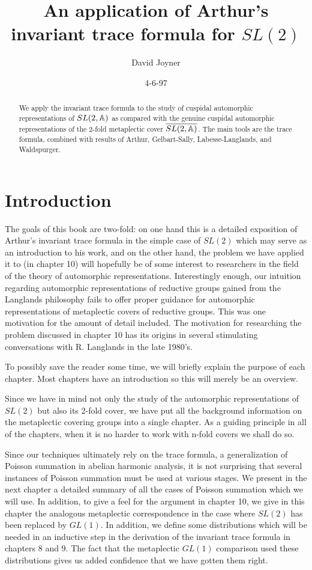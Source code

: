 \documentclass[12pt,thmsa]{book}
\begin{document}
\author{David Joyner}
\title{An application of Arthur's invariant trace formula for $SL(2)$}
\date{4-6-97}
\maketitle

\begin{abstract}
We apply the invariant trace formula to the study of cuspidal automorphic
representations of $SL(2,\Bbb{A})$ as compared with the genuine cuspidal
automorphic representations of the 2-fold metaplectic cover $\overline{SL(2,%
\Bbb{A})}$. The main tools are the trace formula, combined with results of
Arthur, Gelbart-Sally, Labesse-Langlands, and Waldspurger.
\end{abstract}

\tableofcontents

\chapter{Introduction}

The goals of this book are two-fold: on one hand this is a detailed
exposition of Arthur's invariant trace formula in the simple case of $SL(2)$
which may serve as an introduction to his work, and on the other hand, the
problem we have applied it to (in chapter 10) will hopefully be of some
interest to researchers in the field of the theory of automorphic
representations. Interestingly enough, our intuition regarding automorphic
representations of reductive groups gained from the Langlands philosophy
fails to offer proper guidance for automorphic representations of
metaplectic covers of reductive groups. This was one motivation for the
amount of detail included. The motivation for researching the problem
discussed in chapter 10 has its origins in several stimulating conversations
with R. Langlands in the late 1980's.

To possibly save the reader some time, we will briefly explain the purpose
of each chapter. Most chapters have an introduction so this will merely be
an overview.

Since we have in mind not only the study of the automorphic representations
of $SL(2)$ but also its 2-fold cover, we have put all the background
information on the metaplectic covering groups into a single chapter. As a
guiding principle in all of the chapters, when it is no harder to work with
n-fold covers we shall do so.

Since our techniques ultimately rely on the trace formula, a generalization
of Poisson summation in abelian harmonic analysis, it is not surprising that
several instances of Poisson summation must be used at various stages. We
present in the next chapter a detailed summary of all the cases of Poisson
summation which we will use. In addition, to give a feel for the argument in
chapter 10, we give in this chapter the analogous metaplectic correspondence
in the case where $SL(2)$ has been replaced by $GL(1)$. In addition, we
define some distributions which will be needed in an inductive step in the
derivation of the invariant trace formula in chapters 8 and 9. The fact that
the metaplectic $GL(1)$ comparison used these distributions gives us added
confidence that we have gotten them right.
\end{document}
